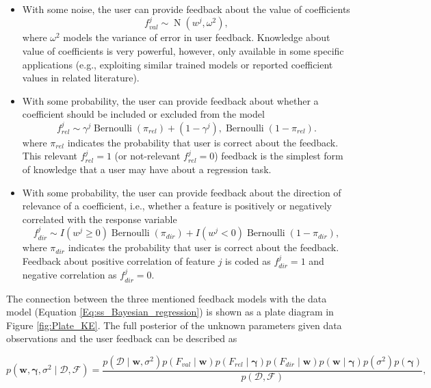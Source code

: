 \documentclass[dissertation,math,vertlayout,pdfa,colorlinks]{aaltoseries}
\newcommand{\bw}{\bm{w}}
\newcommand{\bD}{\mathcal{D}}
\newcommand{\bF}{\mathcal{F}}
\DeclareMathOperator{\bernoullipdf}{Bernoulli}
\DeclareMathOperator{\normalpdf}{N}
\begin{document}
\begin{itemize}
	\item With some noise, the user can provide feedback about the value of coefficients
	\begin{equation}\label{Eq:fb_on_val_coeff}
	f_{val}^{j} \sim \normalpdf(w^j, \omega^2),
	\end{equation}
	\noindent where $\omega^2$ models the variance of error in user feedback. Knowledge about value of coefficients is very powerful, however, only available in some specific applications (e.g., exploiting similar trained models or reported coefficient values in related literature).
	 
	\item With some probability, the user can provide feedback about whether a coefficient should be included or excluded from the model
	\begin{equation}\label{Eq:fb_on_rel_coeff}
	f_{rel}^{j} \sim \gamma^j \bernoullipdf(\pi_{rel}) + (1 - \gamma^j), \bernoullipdf(1 - \pi_{rel}).
	\end{equation}
	\noindent where $\pi_{rel}$ indicates the probability that user is correct about the feedback. This relevant $f_{rel}^{j}=1$ (or not-relevant $f_{rel}^{j}=0$) feedback is the simplest form of knowledge that a user may have about a regression task.
	 
	\item With some probability, the user can provide feedback about the direction of relevance of a coefficient, i.e., whether a feature is positively or negatively correlated with the response variable
	\begin{equation}\label{Eq:fb_on_dir_coeff}
	f_{dir}^{j} \sim I(w^j \geq 0) \bernoullipdf(\pi_{dir}) + I(w^j < 0) \bernoullipdf(1 - \pi_{dir}),
	\end{equation}
	\noindent where $\pi_{dir}$ indicates the probability that user is correct about the feedback. Feedback about positive correlation of feature $j$ is coded as $f_{dir}^{j}=1$ and negative correlation as $f_{dir}^{j}=0$.
\end{itemize}



The connection between the three mentioned feedback models with the data model (Equation \ref{Eq:ss_Bayesian_regression}) is shown as a plate diagram in Figure \ref{fig:Plate_KE}. The full posterior of the unknown parameters given data observations and the user feedback can be described as 

\begin{equation}\label{Eq:Bayes_rule_ss_reg_with_fb}
p(\bw, \bm{\gamma}, \sigma^2 \mid \bD,\bF) = \frac{p(\bD \mid \bw, \sigma^2)p(F_{val} \mid \bw)p(F_{rel} \mid \bm{\gamma})p(F_{dir} \mid \bw)p(\bw \mid \bm{\gamma})p(\sigma^2)p(\bm{\gamma})}{p(\bD,\bF)},
\end{equation} 
\end{document}
